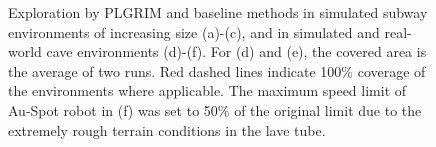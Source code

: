 \documentclass[letterpaper]{article} %
\begin{document}
\begin{figure}[t!]
			\caption{Exploration by PLGRIM and baseline methods in simulated subway environments of increasing size (a)-(c), and in simulated and real-world cave environments (d)-(f). For (d) and (e), the covered area is the average of two runs. Red dashed lines indicate 100\% coverage of the environments where applicable. The maximum speed limit of Au-Spot robot in (f) was set to 50\% of the original limit due to the extremely rough terrain conditions in the lave tube.}
    \label{fig:all_together_plot}
\end{figure}
\end{document}
